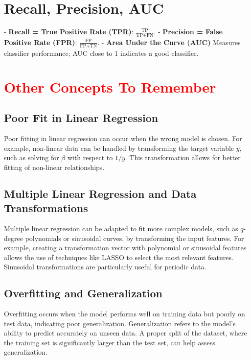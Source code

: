 \documentclass[10pt]{article}
\begin{document}
\begin{multicols}{2}
\section*{Recall, Precision, AUC}
- \textbf{Recall = True Positive Rate (TPR)}: $\frac{\text{TP}}{\text{TP} + \text{FN}}$.
- \textbf{Precision = False Positive Rate (FPR)}: $\frac{\text{FP}}{\text{FP} + \text{TN}}$.
- \textbf{Area Under the Curve (AUC)} Measures classifier performance; AUC close to 1 indicates a good classifier.



\section*{\textcolor{red}{Other Concepts To Remember}}

\subsection*{Poor Fit in Linear Regression}
Poor fitting in linear regression can occur when the wrong model is chosen. For example, non-linear data can be handled by transforming the target variable \( y \), such as solving for \( \beta \) with respect to \( 1/y \). This transformation allows for better fitting of non-linear relationships.

\subsection*{Multiple Linear Regression and Data Transformations}
Multiple linear regression can be adapted to fit more complex models, such as \( q \)-degree polynomials or sinusoidal curves, by transforming the input features. For example, creating a transformation vector with polynomial or sinusoidal features allows the use of techniques like LASSO to select the most relevant features. Sinusoidal transformations are particularly useful for periodic data.

\subsection*{Overfitting and Generalization}
Overfitting occurs when the model performs well on training data but poorly on test data, indicating poor generalization. Generalization refers to the model's ability to predict accurately on unseen data. A proper split of the dataset, where the training set is significantly larger than the test set, can help assess generalization.


\end{multicols}
\end{document}
